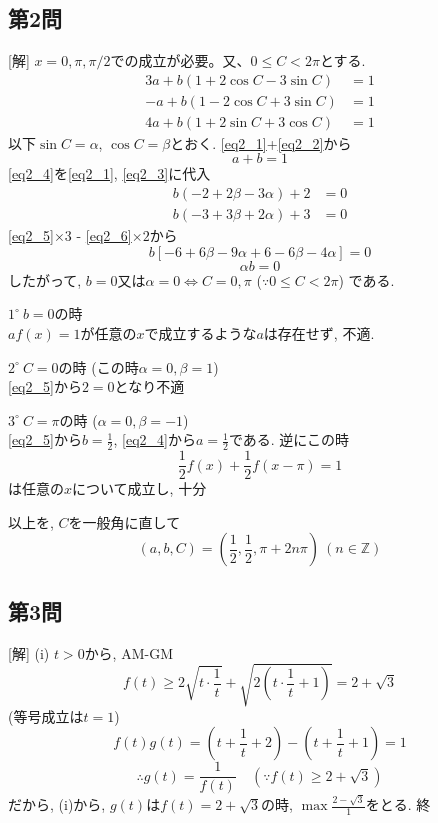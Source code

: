\documentclass[../main.tex]{subfiles}
\begin{document}
\subsection*{第2問}
[解] $x=0, \pi, \pi/2$での成立が必要。又、$0 \le C < 2\pi$とする.
\begin{align}
  3a + b(1+2\cos C - 3\sin C) &= 1 \label{eq2_1} \\
  -a + b(1-2\cos C + 3\sin C) &= 1 \label{eq2_2} \\
  4a + b(1+2\sin C + 3\cos C) &= 1 \label{eq2_3}
\end{align}
以下$\sin C = \alpha$, $\cos C = \beta$とおく. \eqref{eq2_1}+\eqref{eq2_2}から
\begin{equation}
  a + b = 1 \label{eq2_4}
\end{equation}
\eqref{eq2_4}を\eqref{eq2_1}, \eqref{eq2_3}に代入
\begin{align}
  b(-2 + 2\beta - 3\alpha) + 2 &= 0 \label{eq2_5} \\
  b(-3 + 3\beta + 2\alpha) + 3 &= 0 \label{eq2_6}
\end{align}
\eqref{eq2_5}$\times 3$ - \eqref{eq2_6}$\times 2$から
\[
  b[-6 + 6\beta - 9\alpha + 6 - 6\beta - 4\alpha] = 0
\]
\[
  \alpha b = 0
\]
したがって, $b=0$又は$\alpha=0 \iff C=0, \pi$ ($\because 0 \le C < 2\pi$) である.

$1^\circ \ b=0$の時\\
$af(x)=1$が任意の$x$で成立するような$a$は存在せず, 不適.

$2^\circ \ C=0$の時 (この時$\alpha=0, \beta=1$)\\
\eqref{eq2_5}から$2=0$となり不適

$3^\circ \ C=\pi$の時 ($\alpha=0, \beta=-1$)\\
\eqref{eq2_5}から$b=\frac{1}{2}$, \eqref{eq2_4}から$a=\frac{1}{2}$である. 逆にこの時
\[
  \frac{1}{2}f(x) + \frac{1}{2}f(x-\pi) = 1
\]
は任意の$x$について成立し, 十分

以上を, $C$を一般角に直して
\[
  (a, b, C) = \left(\frac{1}{2}, \frac{1}{2}, \pi + 2n\pi\right) \ (n \in \mathbb{Z})
\]

\subsection*{第3問}
[解]
(i) $t > 0$から, AM-GM
\[
  f(t) \ge 2\sqrt{t \cdot \frac{1}{t}} + \sqrt{2\left(t \cdot \frac{1}{t} + 1\right)} = 2 + \sqrt{3}
\]
(等号成立は$t=1$)
\[
  f(t)g(t) = \left(t+\frac{1}{t}+2\right) - \left(t+\frac{1}{t}+1\right) = 1
\]
\[
  \therefore g(t) = \frac{1}{f(t)} \quad (\because f(t) \ge 2+\sqrt{3})
\]
だから, (i)から, $g(t)$は$f(t) = 2+\sqrt{3}$の時, $\max \frac{2-\sqrt{3}}{1}$をとる. 終
\end{document}
